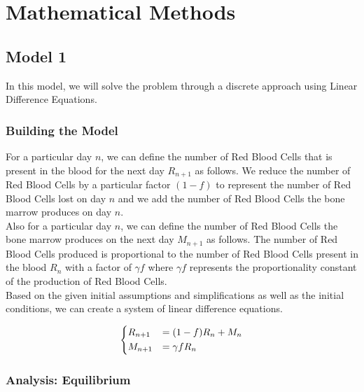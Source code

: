 \section{Mathematical Methods}
\label{sec:mathematical-methods}

\subsection{Model 1}
\label{subsec:model-1}

In this model, we will solve the problem through a discrete approach using Linear Difference Equations.

\subsubsection{Building the Model}

For a particular day $n$, we can define the number of Red Blood Cells that is present in the blood for the next day $R_{n+1}$ as follows. We reduce the number of Red Blood Cells by a particular factor $(1-f)$ to represent the number of Red Blood Cells lost on day $n$ and we add the number of Red Blood Cells the bone marrow produces on day $n$.\\

Also for a particular day $n$, we can define the number of Red Blood Cells the bone marrow produces on the next day $M_{n+1}$ as follows. The number of Red Blood Cells produced is proportional to the number of Red Blood Cells present in the blood $R_n$ with a factor of $\gamma f$ where $\gamma f$ represents the proportionality constant of the production of Red Blood Cells.\\

Based on the given initial assumptions and simplifications as well as the initial conditions, we can create a system of linear difference equations.

\begin{equation}
    \begin{dcases}
        R_{n+1} &= (1-f)R_n + M_n\\
        M_{n+1} &= \gamma fR_n
    \end{dcases}
    \label{eq:linear-difference-model-system}
\end{equation}

\subsubsection{Analysis: Equilibrium}

